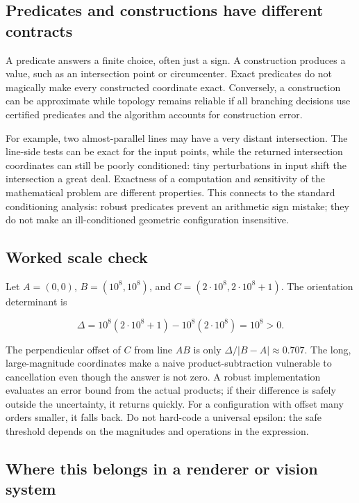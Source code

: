 \subsection{Predicates and constructions have different contracts}\label{02-foundations-ii-ch034-predicates-and-constructions-have-different-contracts}

A predicate answers a finite choice, often just a sign. A construction produces a value, such as an intersection point or circumcenter. Exact predicates do not magically make every constructed coordinate exact. Conversely, a construction can be approximate while topology remains reliable if all branching decisions use certified predicates and the algorithm accounts for construction error.

For example, two almost-parallel lines may have a very distant intersection. The line-side tests can be exact for the input points, while the returned intersection coordinates can still be poorly conditioned: tiny perturbations in input shift the intersection a great deal. Exactness of a computation and sensitivity of the mathematical problem are different properties. This connects to the standard conditioning analysis: robust predicates prevent an arithmetic sign mistake; they do not make an ill-conditioned geometric configuration insensitive.

\subsection{Worked scale check}\label{02-foundations-ii-ch034-worked-scale-check}

Let \(A=(0,0)\), \(B=(10^8,10^8)\), and \(C=(2\cdot10^8,2\cdot10^8+1)\). The orientation determinant is

\[
\Delta=10^8(2\cdot10^8+1)-10^8(2\cdot10^8)=10^8>0.
\]

The perpendicular offset of \(C\) from line \(AB\) is only \(\Delta/|B-A|\approx0.707\). The long, large-magnitude coordinates make a naive product-subtraction vulnerable to cancellation even though the answer is not zero. A robust implementation evaluates an error bound from the actual products; if their difference is safely outside the uncertainty, it returns quickly. For a configuration with offset many orders smaller, it falls back. Do not hard-code a universal epsilon: the safe threshold depends on the magnitudes and operations in the expression.

\subsection{Where this belongs in a renderer or vision system}\label{02-foundations-ii-ch034-where-this-belongs-in-a-renderer-or-vision-system}

